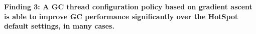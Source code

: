 \textbf{Finding 3: 
A GC thread configuration policy based on gradient ascent is able to improve GC performance significantly over the HotSpot default settings, in many cases.
}